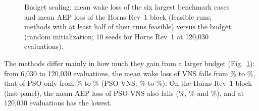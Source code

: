 \begin{figure}[!htbp]
\centering
{}
\caption{Budget scaling: mean wake loss of the six largest benchmark cases and mean AEP loss of the Horns Rev~1 block (feasible runs; methods with at least half of their runs feasible) versus the budget (random initialization; 10 seeds for Horns Rev~1 at 120,030 evaluations).}
\label{fig:budget}
\end{figure}

The methods differ mainly in how much they gain from a larger budget (Fig.~\ref{fig:budget}): from 6,030 to 120,030 evaluations, the mean wake loss of VNS falls from \NBudLossVNSSixK\% to \NBudLossVNSOneTwentyK\%, that of PSO only from \NBudLossPSOSixK\% to \NBudLossPSOOneTwentyK\% (PSO-VNS: \NBudLossPSOVNSSixK\% to \NBudLossPSOVNSOneTwentyK\%). On the Horns Rev~1 block (last panel), the mean AEP loss of PSO-VNS also falls (\NHRLossSixKPSOVNS\%, \NHRLossThirtyKPSOVNS\% and \NHRLossOneTwentyKPSOVNS\%), and at 120,030 evaluations \NHRBestHundredTwentyK{} has the lowest.

